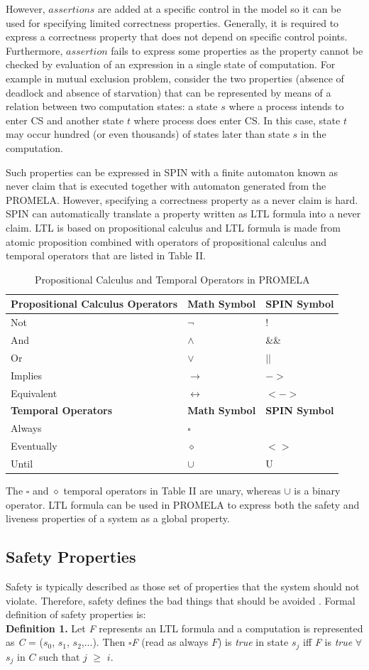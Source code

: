 \documentclass[conference]{IEEEtran}
\begin{document}
However, $assertions$ are added at a specific control in the model so it can be used for specifying limited correctness properties. 
Generally, it is required to express a correctness property that does not depend on specific control points. Furthermore, $assertion$ fails 
to express some properties as the property cannot be checked by evaluation of an expression in a single state of computation. For example in
mutual exclusion problem, consider the two properties (absence of deadlock and absence of starvation) that can be represented by means of a 
relation between two computation states: a state $s$ where a process intends to enter CS and another state $t$ where process does enter CS. In this 
case, state $t$ may occur hundred (or even thousands) of states later than state $s$ in the computation. 

Such properties can be expressed in SPIN with a finite automaton known as never claim that is executed together with automaton generated from 
the PROMELA. However, specifying a correctness property as a never claim is hard. SPIN can automatically translate a property written as LTL 
formula into a never claim.  LTL is based on propositional calculus and LTL formula is made from atomic proposition combined with operators of 
propositional calculus and temporal operators that are listed in Table II.
\begin{table}[!ht]
\caption{Propositional Calculus and Temporal Operators in PROMELA}
\centering
 \begin{tabular}{|>{\centering}p{2.5cm}|>{\centering} p{2cm} |>{\centering} p{2cm} |}
 \hline
\textbf{Propositional Calculus Operators} & \textbf{Math Symbol} & \textbf{SPIN Symbol}\tabularnewline
\hline
Not & $\neg$ & !\tabularnewline
And & $\land$ & \&\&\tabularnewline
Or & $\lor$ &$||$\tabularnewline
Implies & $\rightarrow$ & $->$\tabularnewline
Equivalent & $\leftrightarrow$ & $<->$\tabularnewline
\hline
\textbf{Temporal Operators} & \textbf{Math Symbol} & \textbf{SPIN Symbol}\tabularnewline
\hline
Always & $\square$ & [ ]\tabularnewline
Eventually & $\diamond$ & $<>$\tabularnewline
Until & $\cup$ & U\tabularnewline
\hline
\end{tabular}    
\end{table}

The $\square$ and $\diamond$  temporal operators in Table II are unary, whereas $\cup$ is a binary operator. 
LTL formula can be used in PROMELA to express both the safety and liveness properties of a system as a global property. 

\subsection{Safety Properties}
Safety is typically described as those set of properties that the system should not violate. Therefore, 
safety defines the bad things that should be avoided \cite{17}. Formal definition of safety properties is: \\
\textbf{Definition 1.} Let \emph{F} represents an LTL formula and a computation is represented as \emph{C} 
= ($s_0$, $s_1$, $s_2$,...). Then $\square$\emph{F} (read as always $F$) is \emph{true} in state $s_j$ iff \emph{F} is \emph{true} $\forall$ 
$s_j$ in $C$ such that $j$ $\geq$ $i$.
\end{document}
